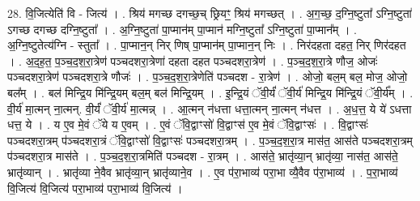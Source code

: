 \documentclass[17pt]{extarticle}
\begin{document}
28. वि॒जित्येति॑ वि - जित्य॑ । . श्रिय॑ मगच्छ दगच्छ॒च् छ्रियꣳ॒॒ श्रिय॑ मगच्छत् । . अ॒ग॒च्छ॒ द॒ग्नि॒ष्टुता᳚ ऽग्नि॒ष्टुता॑ ऽगच्छ दगच्छ दग्नि॒ष्टुता᳚ । . अ॒ग्नि॒ष्टुता॑ पा॒प्मान॑म् पा॒प्मान॑ मग्नि॒ष्टुता᳚ ऽग्नि॒ष्टुता॑ पा॒प्मान᳚म् । . अ॒ग्नि॒ष्टुतेत्य॑ग्नि - स्तुता᳚ । . पा॒प्मान॒न् निर् णिष् पा॒प्मान॑म् पा॒प्मान॒न् निः । . निर॑दहता दहत॒ निर् णिर॑दहत । . अ॒द॒ह॒त॒ प॒ञ्च॒द॒श॒रा॒त्रेण॑ पञ्चदशरा॒त्रेणा॑ दहता दहत पञ्चदशरा॒त्रेण॑ । . प॒ञ्च॒द॒श॒रा॒त्रे णौज॒ ओजः॑ पञ्चदशरा॒त्रेण॑ पञ्चदशरा॒त्रे णौजः॑ । . प॒ञ्च॒द॒श॒रा॒त्रेणेति॑ पञ्चदश - रा॒त्रेण॑ । . ओजो॒ बल॒म् बल॒ मोज॒ ओजो॒ बल᳚म् । . बल॑ मिन्द्रि॒य मि॑न्द्रि॒यम् बल॒म् बल॑ मिन्द्रि॒यम् । . इ॒न्द्रि॒यं ॅवी॒र्यं॑ ॅवी॒र्य॑ मिन्द्रि॒य मि॑न्द्रि॒यं ॅवी॒र्य᳚म् । . वी॒र्य॑ मा॒त्मन् ना॒त्मन्. वी॒र्यं॑ ॅवी॒र्य॑ मा॒त्मन्न् । . आ॒त्मन् न॑धत्ता धत्ता॒त्मन् ना॒त्मन् न॑धत्त । . अ॒ध॒त्त॒ ये ये॑ ऽधत्ता धत्त॒ ये । . य ए॒व मे॒वं ॅये य ए॒वम् । . ए॒वं ॅवि॒द्वाꣳसो॑ वि॒द्वाꣳस॑ ए॒व मे॒वं ॅवि॒द्वाꣳसः॑ । . वि॒द्वाꣳसः॑ पञ्चदशरा॒त्रम् प॑ञ्चदशरा॒त्रं ॅवि॒द्वाꣳसो॑ वि॒द्वाꣳसः॑ पञ्चदशरा॒त्रम् । . प॒ञ्च॒द॒श॒रा॒त्र मास॑त॒ आस॑ते पञ्चदशरा॒त्रम् प॑ञ्चदशरा॒त्र मास॑ते । . प॒ञ्च॒द॒श॒रा॒त्रमिति॑ पञ्चदश - रा॒त्रम् । . आस॑ते॒ भ्रातृ॑व्या॒न् भ्रातृ॑व्या॒ नास॑त॒ आस॑ते॒ भ्रातृ॑व्यान् । . भ्रातृ॑व्या ने॒वैव भ्रातृ॑व्या॒न् भ्रातृ॑व्याने॒व । . ए॒व प॑रा॒भाव्य॑ परा॒भा व्यै॒वैव प॑रा॒भाव्य॑ । . प॒रा॒भाव्य॑ वि॒जित्य॑ वि॒जित्य॑ परा॒भाव्य॑ परा॒भाव्य॑ वि॒जित्य॑ । \newline
\end{document}

